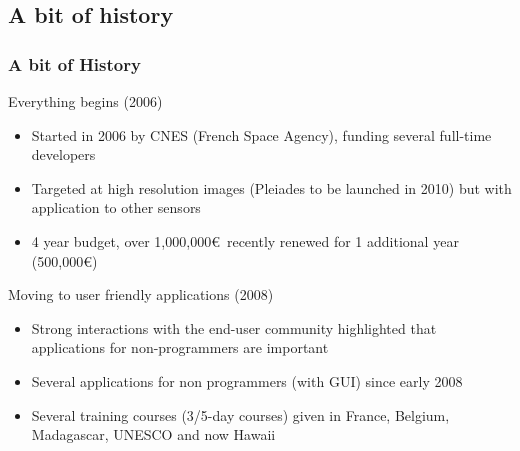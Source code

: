 \documentclass[compress]{beamer}
\begin{document}
\subsection[When]{A bit of history}
\begin{frame}
\frametitle{A bit of History}
\begin{block}{Everything begins (2006)}
\scriptsize
\begin{itemize}
 \item Started in 2006 by CNES (French Space Agency), funding \alert{several full-time developers}
 \item Targeted at high resolution images (Pleiades to be launched in 2010) but with application to other sensors
 \item 4 year budget, over 1,000,000\euro~recently renewed for 1 additional
       year (500,000\euro)
\end{itemize}
\end{block}
\begin{block}{Moving to user friendly applications (2008)}
\scriptsize
\begin{itemize}
  \item Strong interactions with the end-user community highlighted that \alert{applications for non-programmers} are important
  \item Several applications for non programmers (with GUI) since early 2008
  \item Several training courses (3/5-day courses) given in France, Belgium,
        Madagascar, UNESCO and now Hawaii
\end{itemize}
\end{block}
\end{frame}
\end{document}
